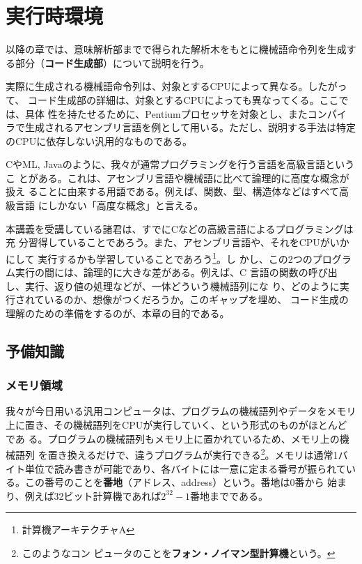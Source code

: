 
\chapter{実行時環境}
\label{083441_12Apr06}

以降の章では、意味解析部までで得られた解析木をもとに機械語命令列を生成す
る部分（{\bf コード生成部}）について説明を行う。

実際に生成される機械語命令列は、対象とするCPUによって異なる。したがって、
コード生成部の詳細は、対象とするCPUによっても異なってくる。ここでは、具体
性を持たせるために、Pentiumプロセッサを対象とし、またコンパイ
ラで生成されるアセンブリ言語を例として用いる。ただし、説明する手法は特定
のCPUに依存しない汎用的なものである。

CやML, Javaのように、我々が通常プログラミングを行う言語を高級言語というこ
とがある。これは、アセンブリ言語や機械語に比べて論理的に高度な概念が扱え
ることに由来する用語である。例えば、関数、型、構造体などはすべて高級言語
にしかない「高度な概念」と言える。

本講義を受講している諸君は、すでにCなどの高級言語によるプログラミングは充
分習得していることであろう。また、アセンブリ言語や、それをCPUがいかにして
実行するかも学習していることであろう\footnote{計算機アーキテクチャA}。し
かし、この2つのプログラム実行の間には、論理的に大きな差がある。例えば、C
言語の関数の呼び出し、実行、返り値の処理などが、一体どういう機械語列にな
り、どのように実行されているのか、想像がつくだろうか。このギャップを埋め、
コード生成の理解のための準備をするのが、本章の目的である。

\section{予備知識}

\subsection{メモリ領域}

我々が今日用いる汎用コンピュータは、プログラムの機械語列やデータをメモリ
上に置き、その機械語列をCPUが実行していく、という形式のものがほとんどであ
る。プログラムの機械語列もメモリ上に置かれているため、メモリ上の機械語列
を置き換えるだけで、違うプログラムが実行できる\footnote{このようなコン
ピュータのことを{\bf フォン・ノイマン型計算機}という。}。メモリは通常1バ
イト単位で読み書きが可能であり、各バイトには一意に定まる番号が振られてい
る。この番号のことを{\bf 番地}（アドレス、address）という。番地は0番から
始まり、例えば32ビット計算機であれば$2^{32}-1$番地までである。

